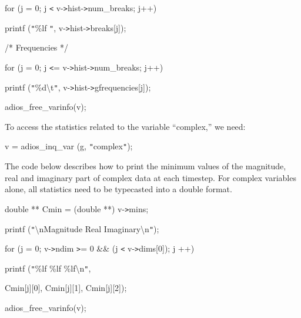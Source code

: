 for (j = 0; j \texttt{<} v-\texttt{>}hist-\texttt{>}num\_breaks; j++)

\parindent=28pt
printf (\texttt{"}\%lf \texttt{"}, v-\texttt{>}hist-\texttt{>}breaks[j]);

\parindent=0pt
/* Frequencies */

for (j = 0; j \texttt{<}= v-\texttt{>}hist-\texttt{>}num\_breaks; j++)

\parindent=28pt
printf (\texttt{"}\%d\textbackslash{}t\texttt{"}, v-\texttt{>}hist-\texttt{>}gfrequencies[j]);

\parindent=0pt
adios\_free\_varinfo(v);

To access the statistics related to the variable ``complex,'' we need:

v = adios\_inq\_var (g, \texttt{"}complex\texttt{"});

The code below describes how to print the minimum values of the magnitude, real 
and imaginary part of complex data at each timestep. For complex variables alone, 
all statistics need to be typecasted into a double format.

double ** Cmin = (double **) v-\texttt{>}mins;

printf (\texttt{"}\textbackslash{}nMagnitude  Real  Imaginary\textbackslash{}n\texttt{"});

for (j = 0; v-\texttt{>}ndim \texttt{>}= 0 \&\&  (j \texttt{<} v-\texttt{>}dims[0]); 
j ++) 

printf (\texttt{"}\%lf \%lf \%lf\textbackslash{}n\texttt{"}, 

Cmin[j][0], Cmin[j][1], Cmin[j][2]);

adios\_free\_varinfo(v);\label{HToc82064268}\label{HToc82067516}\label{HToc84890309}\label{HToc212016684}\label{HToc212016926}\label{HToc82067538}\label{HToc182553452}
